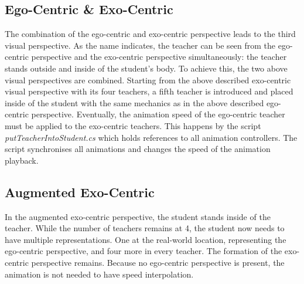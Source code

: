 \subsection{Ego-Centric \& Exo-Centric}
The combination of the ego-centric and exo-centric perspective leads to the third visual perspective. As the name indicates, the teacher can be seen from the ego-centric perspective and the exo-centric perspective simultaneously: the teacher stands outside and inside of the student's body. To achieve this, the two above visual perspectives are combined. Starting from the above described exo-centric visual perspective with its four teachers, a fifth teacher is introduced and placed inside of the student with the same mechanics as in the above described ego-centric perspective. Eventually, the animation speed of the ego-centric teacher must be applied to the exo-centric teachers. This happens by the script \textit{putTeacherIntoStudent.cs} which holds references to all animation controllers. The script synchronises all animations and changes the speed of the animation playback.
\subsection{Augmented Exo-Centric}
In the augmented exo-centric perspective, the student stands inside of the teacher. While the number of teachers remains at 4, the student now needs to have multiple representations. One at the real-world location, representing the ego-centric perspective, and four more in every teacher. The formation of the exo-centric perspective remains. Because no ego-centric perspective is present, the animation is not needed to have speed interpolation.

